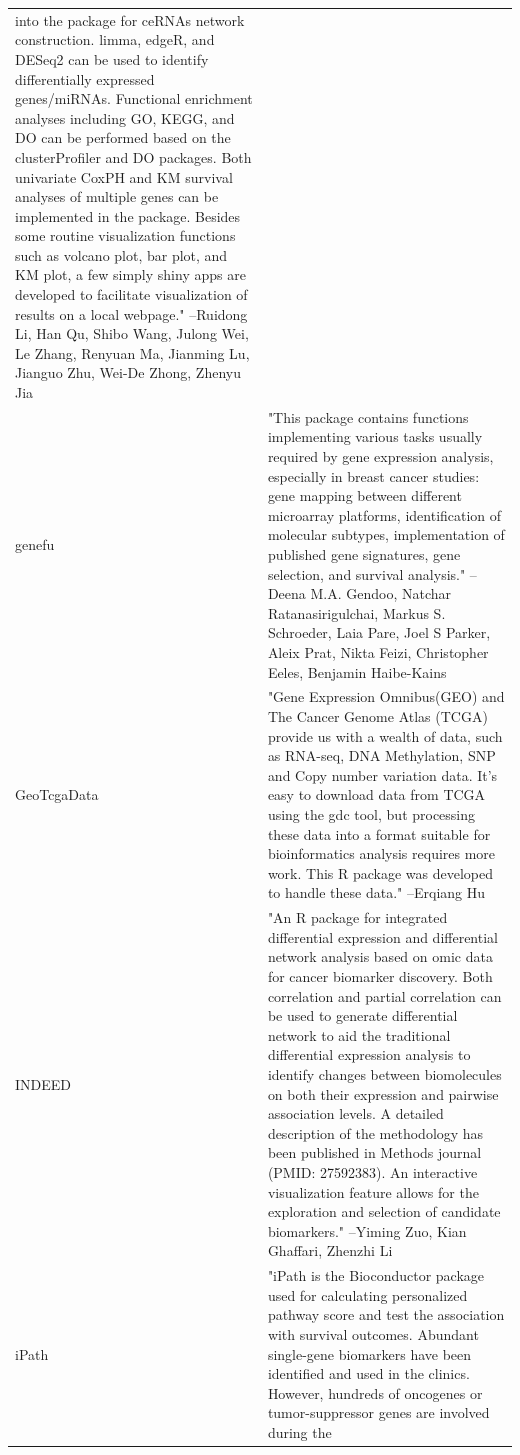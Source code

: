 \begin{longtable}[t]{l>{\raggedright\arraybackslash}p{25em}}
into the package for ceRNAs network construction. limma, edgeR,
and DESeq2 can be used to identify differentially expressed
genes/miRNAs. Functional enrichment analyses including GO,
KEGG, and DO can be performed based on the clusterProfiler and
DO packages. Both univariate CoxPH and KM survival analyses of
multiple genes can be implemented in the package. Besides some
routine visualization functions such as volcano plot, bar plot,
and KM plot, a few simply shiny apps are developed to
facilitate visualization of results on a local webpage." --Ruidong Li, Han Qu, Shibo Wang, Julong Wei, Le Zhang, Renyuan Ma, Jianming Lu, Jianguo Zhu, Wei-De Zhong, Zhenyu Jia\\
genefu & "This package contains functions implementing various tasks
usually required by gene expression analysis, especially in
breast cancer studies: gene mapping between different
microarray platforms, identification of molecular subtypes,
implementation of published gene signatures, gene selection,
and survival analysis." --Deena M.A. Gendoo, Natchar Ratanasirigulchai, Markus S. Schroeder, Laia Pare, Joel S Parker, Aleix Prat, Nikta Feizi, Christopher Eeles, Benjamin Haibe-Kains\\
GeoTcgaData & "Gene Expression Omnibus(GEO) and The Cancer Genome Atlas
(TCGA) provide us with a wealth of data, such as RNA-seq, DNA
Methylation, SNP and Copy number variation data. It's easy to
download data from TCGA using the gdc tool, but processing
these data into a format suitable for bioinformatics analysis
requires more work. This R package was developed to handle
these data." --Erqiang Hu\\
INDEED & "An R package for integrated differential expression and
differential network analysis based on omic data for cancer
biomarker discovery. Both correlation and partial correlation
can be used to generate differential network to aid the
traditional differential expression analysis to identify
changes between biomolecules on both their expression and
pairwise association levels. A detailed description of the
methodology has been published in Methods journal (PMID:
27592383). An interactive visualization feature allows for the
exploration and selection of candidate biomarkers." --Yiming Zuo, Kian Ghaffari, Zhenzhi Li\\
iPath & "iPath is the Bioconductor package used for calculating
personalized pathway score and test the association with
survival outcomes. Abundant single-gene biomarkers have been
identified and used in the clinics. However, hundreds of
oncogenes or tumor-suppressor genes are involved during the

\end{longtable}
